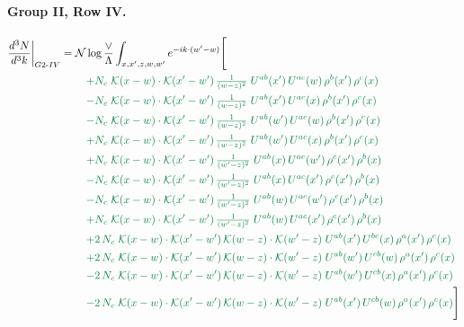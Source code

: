 \documentclass[10pt]{article}
\numberwithin{equation}{section}
\newcommand{\NN}{\mathcal N\log\frac{\vee}{\Lambda}}
\begin{document}
\paragraph{Group II, Row IV.}
\begin{align}
\frac{d^3N}{d^3k}\bigg|_{G2\text{-}IV}={}&\NN\int_{x,x',z,w,w'}e^{-ik\cdot(w'-w)}\Bigg[\notag\\
&\quad{\color{JIM}+N_c\;\mathcal{K}(x-w)\cdot\mathcal{K}(x'-w')\,\tfrac{1}{(w-z)^{2}}\;U^{ab}(x')\,U^{ac}(w)\,\rho^{b}(x')\,\rho^{c}(x)}\notag\\
&\quad{\color{JIM}-N_c\;\mathcal{K}(x-w)\cdot\mathcal{K}(x'-w')\,\tfrac{1}{(w-z)^{2}}\;U^{ab}(x')\,U^{ac}(x)\,\rho^{b}(x')\,\rho^{c}(x)}\notag\\
&\quad{\color{JIM}-N_c\;\mathcal{K}(x-w)\cdot\mathcal{K}(x'-w')\,\tfrac{1}{(w-z)^{2}}\;U^{ab}(w')\,U^{ac}(w)\,\rho^{b}(x')\,\rho^{c}(x)}\notag\\
&\quad{\color{JIM}+N_c\;\mathcal{K}(x-w)\cdot\mathcal{K}(x'-w')\,\tfrac{1}{(w-z)^{2}}\;U^{ab}(w')\,U^{ac}(x)\,\rho^{b}(x')\,\rho^{c}(x)}\notag\\
&\quad{\color{JIM}+N_c\;\mathcal{K}(x-w)\cdot\mathcal{K}(x'-w')\,\tfrac{1}{(w'-z)^{2}}\;U^{ab}(x)\,U^{ac}(w')\,\rho^{c}(x')\,\rho^{b}(x)}\notag\\
&\quad{\color{JIM}-N_c\;\mathcal{K}(x-w)\cdot\mathcal{K}(x'-w')\,\tfrac{1}{(w'-z)^{2}}\;U^{ab}(x)\,U^{ac}(x')\,\rho^{c}(x')\,\rho^{b}(x)}\notag\\
&\quad{\color{JIM}-N_c\;\mathcal{K}(x-w)\cdot\mathcal{K}(x'-w')\,\tfrac{1}{(w'-z)^{2}}\;U^{ab}(w)\,U^{ac}(w')\,\rho^{c}(x')\,\rho^{b}(x)}\notag\\
&\quad{\color{JIM}+N_c\;\mathcal{K}(x-w)\cdot\mathcal{K}(x'-w')\,\tfrac{1}{(w'-z)^{2}}\;U^{ab}(w)\,U^{ac}(x')\,\rho^{c}(x')\,\rho^{b}(x)}\notag\\
&\quad{\color{JIM}+2\,N_c\;\mathcal{K}(x-w)\cdot\mathcal{K}(x'-w')\,\mathcal{K}(w-z)\cdot\mathcal{K}(w'-z)\;U^{ab}(x')\,U^{bc}(x)\,\rho^{a}(x')\,\rho^{c}(x)}\notag\\
&\quad{\color{JIM}+2\,N_c\;\mathcal{K}(x-w)\cdot\mathcal{K}(x'-w')\,\mathcal{K}(w-z)\cdot\mathcal{K}(w'-z)\;U^{ab}(w')\,U^{cb}(w)\,\rho^{a}(x')\,\rho^{c}(x)}\notag\\
&\quad{\color{JIM}-2\,N_c\;\mathcal{K}(x-w)\cdot\mathcal{K}(x'-w')\,\mathcal{K}(w-z)\cdot\mathcal{K}(w'-z)\;U^{ab}(w')\,U^{cb}(x)\,\rho^{a}(x')\,\rho^{c}(x)}\notag\\
&\quad{\color{JIM}-2\,N_c\;\mathcal{K}(x-w)\cdot\mathcal{K}(x'-w')\,\mathcal{K}(w-z)\cdot\mathcal{K}(w'-z)\;U^{ab}(x')\,U^{cb}(w)\,\rho^{a}(x')\,\rho^{c}(x)}\Bigg]\label{eq:gen6}
\end{align}
\end{document}

